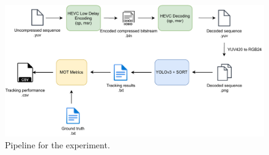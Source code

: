 \begin{figure}[!htb]
  \centering
  \includegraphics[width=1.0\linewidth]{img/experiment_pipeline.pdf}
  \caption[Pipeline for the experiment]
  {Pipeline for the experiment.}
  \label{fig:experiment_pipeline}
\end{figure}
